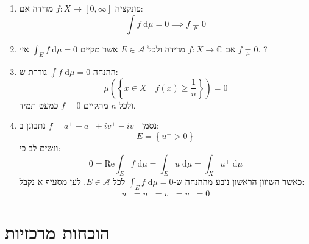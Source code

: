 \documentclass{tstextbook}
\begin{document}
\begin{lemma}
  \begin{enumerate}
    \item פונקציה \(f:X\to\left[ 0,\infty \right]\) מדידה אם: 
$$\int f \;\mathrm{d} \mu=0 \implies f\underset{\mu}{=} 0$$


    \item אם \(f:X\to \mathbb{C}\) מדידה ולכל \(E \in \mathcal{A}\) אשר מקיים \(\int _{E}f \;\mathrm{d} \mu=0\) אזי \(f\underset{\mu}{=} 0\). 
?


    \item ההנחה \(\int  f  \;\mathrm{d} \mu=0\) גוררת ש: 
$$\mu\left( \left\{  x \in X\quad f(x)\geq \frac{1}{n}  \right\} \right)=0$$
ולכל \(n\) מתקיים \(f=0\) כמעט תמיד.


    \item נסמן \(f=a^{+}-a^{-}+iv^{+}-iv^{-}\) נתבונן ב: 
$$E=\left\{  u^{+}> 0  \right\}$$
ונשים לב כי:
$$0=\mathrm{Re}\int_{E} f \;\mathrm{d} \mu  = \int _{E}u \;\mathrm{d} \mu = \int _{X}u^{+} \;\mathrm{d} \mu  $$
כאשר השיוון הראשון נובע מההנחה ש-\(\int _{E}f \;\mathrm{d} \mu=0\) לכל \(E \in \mathcal{A}\). לען מסעיף א נקבל:
$$u^{+}=u^{-}=v^{+}=v^{-}=0$$


  \end{enumerate}
\end{lemma}
\section{הוכחות מרכזיות}
\end{document}
